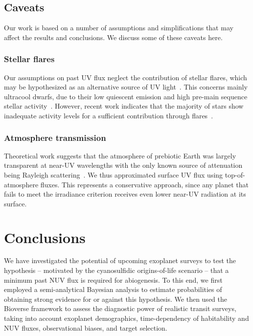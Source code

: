 \documentclass[twocolumn,twocolappendix,linenumbers]{aastex631}
\begin{document}
\subsection{Caveats}
Our work is based on a number of assumptions and simplifications that may affect the results and conclusions.
We discuss some of these caveats here.

\subsubsection{Stellar flares}
Our assumptions on past UV flux neglect the contribution of stellar flares, which may be hypothesized as an alternative source of UV light~\citep{Ranjan2017}.
This concerns mainly ultracool dwarfs, due to their low quiescent emission and high pre-main sequence stellar activity~\citep{Buccino2007,West2008}.
However, recent work indicates that the majority of stars show inadequate activity levels for a sufficient contribution through flares~\citep{Glazier2020,Ducrot2020,Guenther2020}.

\subsubsection{Atmosphere transmission}
Theoretical work suggests that the atmosphere of prebiotic Earth was largely transparent at near-UV wavelengths with the only known source of attenuation being Rayleigh scattering~\citep{Ranjan2017,Ranjan2017c}.
We thus approximated surface UV flux using top-of-atmosphere fluxes.
This represents a conservative approach, since any planet that fails to meet the irradiance criterion receives even lower near-UV radiation at its surface. 


\section{Conclusions}
We have investigated the potential of upcoming exoplanet surveys to test the hypothesis -- motivated by the cyanosulfidic origins-of-life scenario -- that a minimum past \gls{NUV} flux is required for abiogenesis.
To this end, we first employed a semi-analytical Bayesian analysis to estimate probabilities of obtaining strong evidence for or against this hypothesis.
We then used the Bioverse framework to assess the diagnostic power of realistic transit surveys, taking into account exoplanet demographics, time-dependency of habitability and \gls{NUV} fluxes, observational biases, and target selection.
\end{document}
